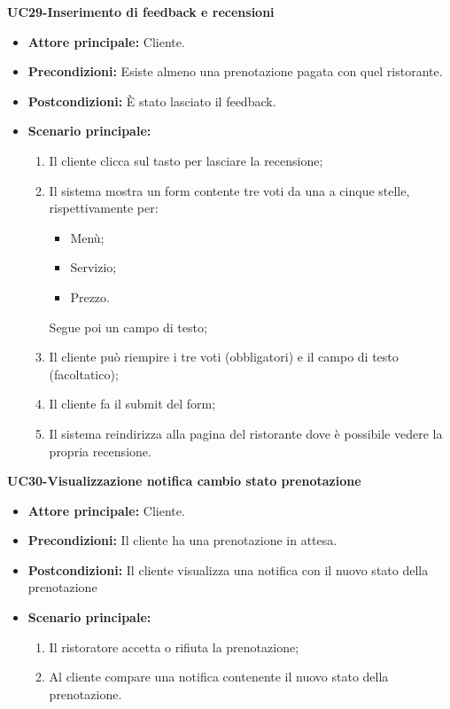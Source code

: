 \textbf{UC29-Inserimento di feedback e recensioni}
\begin{itemize}
\item \textbf{Attore principale:} Cliente.
\item \textbf{Precondizioni:} Esiste almeno una prenotazione pagata con quel ristorante.
\item \textbf{Postcondizioni:} È stato lasciato il feedback.
\item \textbf{Scenario principale:}
\begin{enumerate}
    \item Il cliente clicca sul tasto per lasciare la recensione;
    \item Il sistema mostra un form contente tre voti da una a cinque stelle, rispettivamente per:
  \begin{itemize}
    \item Menù;
    \item Servizio;
    \item Prezzo.
  \end{itemize}
      Segue poi un campo di testo;
    \item Il cliente può riempire i tre voti (obbligatori) e il campo di testo (facoltatico);
    \item Il cliente fa il submit del form;
    \item Il sistema reindirizza alla pagina del ristorante dove è possibile vedere la propria recensione.
\end{enumerate}
\end{itemize}

\textbf{UC30-Visualizzazione notifica cambio stato prenotazione}
\begin{itemize}
\item \textbf{Attore principale:} Cliente.
\item \textbf{Precondizioni:} Il cliente ha una prenotazione in attesa.
\item \textbf{Postcondizioni:} Il cliente visualizza una notifica con il nuovo stato della prenotazione
\item \textbf{Scenario principale:}
\begin{enumerate}
    \item Il ristoratore accetta o rifiuta la prenotazione;
    \item Al cliente compare una notifica contenente il nuovo stato della prenotazione.
\end{enumerate}
\end{itemize}

